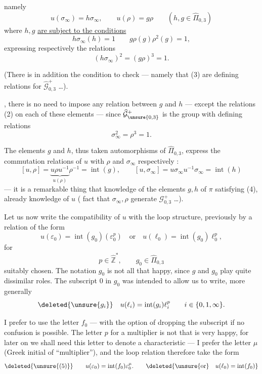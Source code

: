 namely
\[
\tag{1}
\boxed{u(\sigma_\infty)=h\sigma_\infty,\qquad u(\rho)=g\rho}
\qquad (h,g\in\widehat{\Pi}_{0,3})
\]
where $h,g$ \uline{are subject to the conditions}
\[
\tag{2}
\boxed{h\sigma_\infty(h)=1\qquad g\rho(g)\rho^2(g)=1},
\]
expressing respectively the relations
\[
\tag{3}
\boxed{(h\sigma_\infty)^2=(g\rho)^3=1}.
\]

(There is in addition the  condition to check --- namely that (3) are defining relations for $\widehat{\mathcal G}_{0,3}^{+}$ \dots).

, there is no need to impose any relation between $g$ and $h$ --- except the relations (2) on each of these elements --- since $\widehat{\mathcal G}_{\unsure{0,3}}^{+}$ is the group with defining relations
\[
\sigma_\infty^2=\rho^3=1.
\]



The elements $g$ and $h$, thus taken  automorphisms of $\widehat{\Pi}_{0,3}$, express the commutation relations of $u$ with \deleted{$\sigma_\infty$} $\rho$ and $\sigma_\infty$ respectively :
\[
\tag{4}
[u,\rho]=\underbrace{u\rho u^{-1}}_{u(\rho)}\rho^{-1}=\operatorname{int}(g),
\qquad
[u,\sigma_\infty]=u\sigma_\infty u^{-1}\sigma_\infty=\operatorname{int}(h)
\]
--- it is a remarkable thing that knowledge of the elements $g,h$ of $\pi$ satisfying (4), already \uline{} knowledge of $u$ (  fact that $\sigma_\infty,\rho$ generate $\mathcal G_{0,3}^{+}$ \dots).

Let us now write the compatibility of $u$ with the loop structure,   previously by a relation of the form
\[
u(\varepsilon_0)=\operatorname{int}(g_0)(\varepsilon_0^p)
\quad\text{or}\quad
u(\ell_0)=\operatorname{int}(g_0)\ell_0^p,
\]
for
\[
p\in\widehat{\mathbb Z}^{*},\qquad g_0\in\widehat{\Pi}_{0,3}
\]
suitably chosen. The notation $g_0$ is not all that happy, since $g$ and $g_0$ play quite dissimilar roles. The subscript $0$ in $g_0$ was intended to allow us to write, more generally
\[
\deleted{\unsure{g_i}}\quad
u(\ell_i)=\operatorname{int}(g_i)\ell_i^p
\qquad i\in\{0,1,\infty\}.
\]



I prefer to use the letter $f_0$ --- with the option of dropping the subscript if no confusion is possible. The letter $p$ for a multiplier is not  that is very happy, for later on  we shall  need this letter to denote a characteristic --- I prefer the letter $\mu$ (Greek initial of ``multiplier''), and the loop relation  therefore take the form
\[
\deleted{\unsure{(5)}}\qquad
u(\varepsilon_0)=\operatorname{int}(f_0)\varepsilon_0^\mu.
\qquad
\deleted{\unsure{\text{or}}\quad u(\ell_0)=\operatorname{int}(f_0)}
\]

